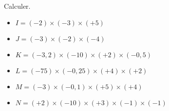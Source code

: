 \begin{exercice*}
    Calculer.
    \begin{itemize}
        \item[] $I = (-2)\times (-3)\times (+5) $
        \item[] $J = (-3)\times (-2)\times (-4) $
        \item[] $K = (-3,2)\times (-10)\times (+2)\times (-0,5) $
        \item[] $L = (-75)\times (-0,25)\times (+4)\times (+2) $
        \item[] $M = (-3)\times (-0,1)\times (+5)\times (+4) $
        \item[] $N = (+2)\times (-10)\times (+3)\times (-1)\times (-1) $
    \end{itemize}
\end{exercice*}

